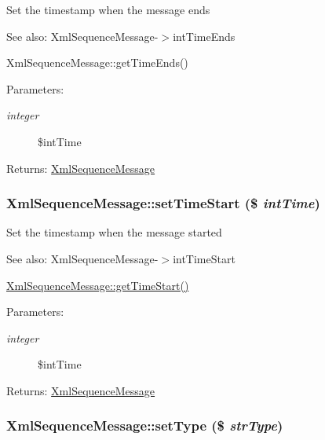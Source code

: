 Set the timestamp when the message ends

\begin{Desc}
\item[See also:]XmlSequenceMessage-$>$intTimeEnds 

XmlSequenceMessage::getTimeEnds() \end{Desc}
\begin{Desc}
\item[Parameters:]
\begin{description}
\item[{\em integer}]\$intTime \end{description}
\end{Desc}
\begin{Desc}
\item[Returns:]\hyperlink{class_xml_sequence_message}{XmlSequenceMessage} \end{Desc}
\hypertarget{class_xml_sequence_message_4125b914cfa073d64b144b5607efdb3d}{
\subsubsection[{setTimeStart}]{\setlength{\rightskip}{0pt plus 5cm}XmlSequenceMessage::setTimeStart (\$ {\em intTime})}}
\label{class_xml_sequence_message_4125b914cfa073d64b144b5607efdb3d}


Set the timestamp when the message started

\begin{Desc}
\item[See also:]XmlSequenceMessage-$>$intTimeStart 

\hyperlink{class_xml_sequence_message_27b24a732d56e0b1cf7fd755d2c52983}{XmlSequenceMessage::getTimeStart()} \end{Desc}
\begin{Desc}
\item[Parameters:]
\begin{description}
\item[{\em integer}]\$intTime \end{description}
\end{Desc}
\begin{Desc}
\item[Returns:]\hyperlink{class_xml_sequence_message}{XmlSequenceMessage} \end{Desc}
\hypertarget{class_xml_sequence_message_a6a08c247856f2721b867676aa130214}{
\subsubsection[{setType}]{\setlength{\rightskip}{0pt plus 5cm}XmlSequenceMessage::setType (\$ {\em strType})}}
\label{class_xml_sequence_message_a6a08c247856f2721b867676aa130214}


